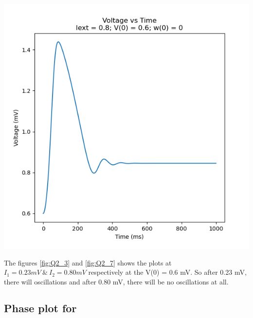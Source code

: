 \documentclass[a4paper, 12pt]{article}
\begin{document}
\begin{minipage}{0.45\linewidth}
    \includegraphics[width=\textwidth]{Q2_7}
    \label{fig:Q2_7}
\end{minipage}

\vspace{2em}
\noindent
The figures \ref{fig:Q2_3} and \ref{fig:Q2_7} shows the plots at $ I_1 = 0.23 mV ~ \& ~ I_2 = 0.80 mV$ respectively at the V(0) = 0.6 mV. So after 0.23 mV, there will oscillations and after 0.80 mV, there will be no oscillations at all.

\subsection{Phase plot for }
\end{document}

